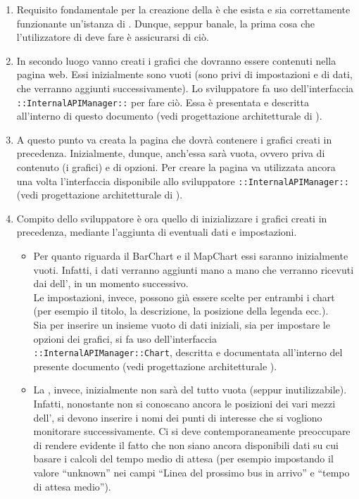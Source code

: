         \begin{enumerate}
            \item Requisito fondamentale per la creazione della  è che esista e sia correttamente funzionante un'istanza di . Dunque, seppur banale, la prima cosa che l'utilizzatore di  deve fare è assicurarsi di ciò.
            \item In secondo luogo vanno creati i grafici che dovranno essere contenuti nella pagina web. Essi inizialmente sono vuoti (sono privi di impostazioni e di dati, che verranno aggiunti successivamente). Lo sviluppatore fa uso dell'interfaccia \texttt{::InternalAPIManager::} per fare ciò. Essa è presentata e descritta all'interno di questo documento (vedi progettazione architetturale di ).
            \item A questo punto va creata la pagina che dovrà contenere i grafici creati in precedenza. Inizialmente, dunque, anch'essa sarà vuota, ovvero priva di contenuto (i grafici) e di opzioni. Per creare la pagina va utilizzata ancora una volta l'interfaccia disponibile allo sviluppatore \texttt{::InternalAPIManager::} (vedi progettazione architetturale di ).
            \item Compito dello sviluppatore è ora quello di inizializzare i grafici creati in precedenza, mediante l'aggiunta di eventuali dati e impostazioni.
            \begin{itemize}
                \item Per quanto riguarda il BarChart e il MapChart essi saranno inizialmente vuoti. Infatti, i dati verranno aggiunti mano a mano che verranno ricevuti dai  dell', in un momento successivo.\\
                Le impostazioni, invece, possono già essere scelte per entrambi i chart (per esempio il titolo, la descrizione, la posizione della legenda ecc.).\\
                Sia per inserire un insieme vuoto di dati iniziali, sia per impostare le opzioni dei grafici, si fa uso dell'interfaccia \texttt{::InternalAPIManager::Chart}, descritta e documentata all'interno del presente documento (vedi progettazione architetturale ).
                \item La , invece, inizialmente non sarà del tutto vuota (seppur inutilizzabile). Infatti, nonostante non si conoscano ancora le posizioni dei vari mezzi dell', si devono inserire i nomi dei punti di interesse che si vogliono monitorare successivamente. Ci si deve contemporaneamente preoccupare di rendere evidente il fatto che non siano ancora disponibili dati su cui basare i calcoli del tempo medio di attesa (per esempio impostando il valore “unknown” nei campi “Linea del prossimo bus in arrivo” e “tempo di attesa medio”).\\

\end{itemize}
\end{enumerate}
